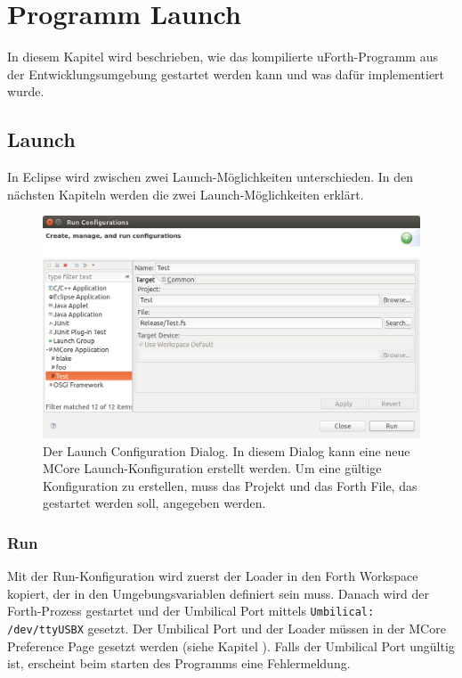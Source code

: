 \chapter{Programm Launch}
\label{chap:programlaunch}
In diesem Kapitel wird beschrieben, wie das kompilierte uForth-Programm aus der Entwicklungsumgebung gestartet werden kann und was dafür implementiert wurde.

\section{Launch}

In Eclipse wird zwischen zwei Launch-Möglichkeiten unterschieden. In den nächsten Kapiteln werden die zwei Launch-Möglichkeiten erklärt.

\begin{figure}[H]
	\centering
		\includegraphics[scale=0.3]{launch/run.png}
		\caption{Der Launch Configuration Dialog. In diesem Dialog kann eine neue MCore Launch-Konfiguration erstellt werden. Um eine gültige Konfiguration zu erstellen, muss das Projekt und das Forth File, das gestartet werden soll, angegeben werden.}
		\label{fig:run}
\end{figure}

\newpage
\subsection{Run}

Mit der Run-Konfiguration wird zuerst der Loader in den Forth Workspace kopiert, der in den Umgebungsvariablen definiert sein muss. Danach wird der Forth-Prozess gestartet und der Umbilical Port mittels \verb!Umbilical: /dev/ttyUSBX! gesetzt. Der Umbilical Port und der Loader müssen in der MCore Preference Page gesetzt werden (siehe Kapitel ). Falls der Umbilical Port ungültig ist, erscheint beim starten des Programms eine Fehlermeldung.

